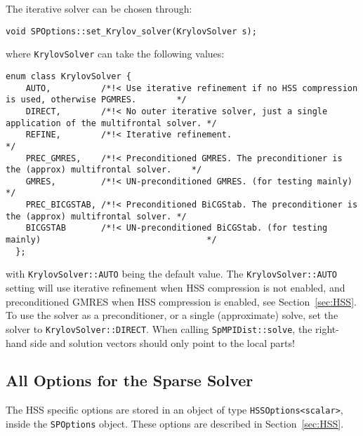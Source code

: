 \documentclass{article}
\begin{document}
The iterative solver can be chosen through:
\begin{lstlisting}[style=C]
  void SPOptions::set_Krylov_solver(KrylovSolver s);
\end{lstlisting}
where \lstinline[style=C]!KrylovSolver! can take the following values:
\begin{lstlisting}[style=C]
  enum class KrylovSolver {
    AUTO,          /*!< Use iterative refinement if no HSS compression is used, otherwise PGMRES.        */
    DIRECT,        /*!< No outer iterative solver, just a single application of the multifrontal solver. */
    REFINE,        /*!< Iterative refinement.                                                            */
    PREC_GMRES,    /*!< Preconditioned GMRES. The preconditioner is the (approx) multifrontal solver.    */
    GMRES,         /*!< UN-preconditioned GMRES. (for testing mainly)                                    */
    PREC_BICGSTAB, /*!< Preconditioned BiCGStab. The preconditioner is the (approx) multifrontal solver. */
    BICGSTAB       /*!< UN-preconditioned BiCGStab. (for testing mainly)                                 */
  };
\end{lstlisting}
with \lstinline[style=C]!KrylovSolver::AUTO! being the default value.
The \lstinline[style=C]!KrylovSolver::AUTO! setting will use iterative
refinement when HSS compression is not enabled, and preconditioned
GMRES when HSS compression is enabled, see Section~\ref{sec:HSS}.  To
use the solver as a preconditioner, or a single (approximate) solve,
set the solver to \lstinline[style=C]!KrylovSolver::DIRECT!. When
calling \lstinline[style=C]!SpMPIDist::solve!, the right-hand side and
solution vectors should only point to the local parts!


\subsection{All Options for the Sparse Solver}
The HSS specific options are stored in an object of type
\lstinline[style=C]!HSSOptions<scalar>!, inside the
\lstinline[style=C]!SPOptions! object. These options are described in
Section~\ref{sec:HSS}.
\end{document}
